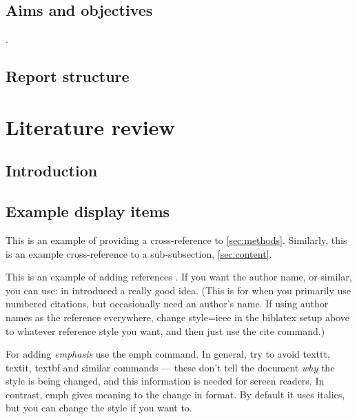   \subsection{Aims and objectives}
  \lipsum[6-7].
  
  \subsection{Report structure}
  \lipsum[8]


\section{Literature review}

  \subsection{Introduction}
    \lipsum[1] 
  
  \subsection{Example display items}
    This is an example of providing a cross-reference to \autoref{sec:methods}. Similarly, this is an example cross-reference to a sub-subsection, \autoref{sec:content}.
    
    This is an example of adding references \cite{ref:jCAS09,ref:jCAS09a,ref:jCAS10}. If you want the author name, or similar, you can use: \citeauthor*{ref:jCAS09} in \citeyear{ref:jCAS09} introduced a really good idea. (This is for when you primarily use numbered citations, but occasionally need an author's name. If using author names as the reference everywhere, change style=ieee in the biblatex setup above to whatever reference style you want, and then just use the cite command.)

    For adding \emph{emphasis} use the emph command. In general, try to avoid texttt, textit, textbf and similar commands --- these don't tell the document \emph{why} the style is being changed, and this information is needed for screen readers. In contrast, emph gives meaning to the change in format. By default it uses italics, but you can change the style if you want to. 
    
